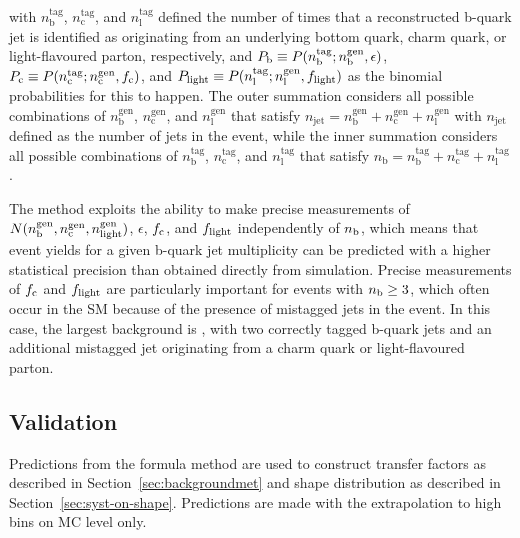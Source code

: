 with $n_{\textrm{b}}^{\textrm{tag}}$,
$n_{\textrm{c}}^{\textrm{tag}}$, and $n_{\textrm{l}}^{\textrm{tag}}$
defined the number of times that a reconstructed b-quark jet is identified
as originating from an underlying bottom quark, charm quark, or
light-flavoured parton, respectively, and $P_{\rm b} \equiv
P(n_{\textrm{b}}^{\textrm{tag}} ; n_{\textrm{b}}^{\textrm{gen}},
\epsilon)$, $P_{\rm c} \equiv P(n_{\textrm{c}}^{\textrm{tag}} ;
n_{\textrm{c}}^{\textrm{gen}}, f_{\rm c})$, and $P_{\rm light} \equiv
P(n_{\textrm{l}}^{\textrm{tag}} ; n_{\textrm{l}}^{\textrm{gen}},
f_{\rm light})$ as the binomial probabilities for this to happen.
The outer summation considers all possible combinations of
$n_{\textrm{b}}^{\textrm{gen}}$, $n_{\textrm{c}}^{\textrm{gen}}$, and
$n_{\textrm{l}}^{\textrm{gen}}$ that satisfy $n_{\textrm{jet}} =
n_{\textrm{b}}^{\textrm{gen}} + n_{\textrm{c}}^{\textrm{gen}} +
n_{\textrm{l}}^{\textrm{gen}}$ with $n_{\textrm{jet}}$ defined as the number 
of jets in the event, while the inner summation considers
all possible combinations of $n_{\textrm{b}}^{\textrm{tag}}$,
$n_{\textrm{c}}^{\textrm{tag}}$, and $n_{\textrm{l}}^{\textrm{tag}}$
that satisfy $n_{\textrm{b}} = n_{\textrm{b}}^{\textrm{tag}} +
n_{\textrm{c}}^{\textrm{tag}} + n_{\textrm{l}}^{\textrm{tag}}$.
  
The method exploits the ability to make precise measurements of
$N(n_{\rm b}^{\rm gen},n_{\rm c}^{\rm gen},n_{\rm light}^{\rm gen})$,
$\epsilon$, $f_{\rm c}$, and $f_{\rm light}$ independently of $n_{\rm
  b}$, which means that event yields for a given b-quark jet
multiplicity can be predicted with a higher statistical precision than
obtained directly from simulation. Precise measurements of $f_{\rm c}$
and $f_{\rm light}$ are particularly important for events with $n_{\rm
  b} \geq 3$, which often occur in the SM because of the presence of
mistagged jets in the event. In this case, the largest background is
\ttbar, with two correctly tagged b-quark jets and an additional
mistagged jet originating from a charm quark or light-flavoured
parton.

\subsection{Validation}

Predictions from the formula method are used to construct transfer 
factors as described in Section~\ref{sec:backgroundmet} and \mht shape distribution
 as described in Section~\ref{sec:syst-on-shape}. Predictions are made
 with the extrapolation to high \nb bins on MC level only.

